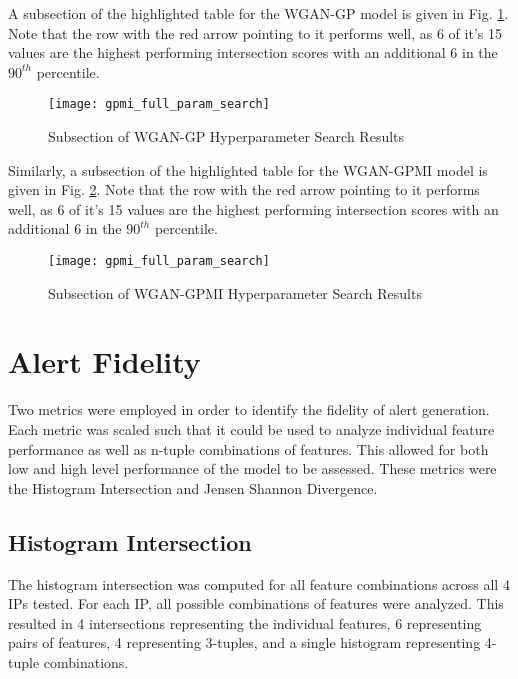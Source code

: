 A subsection of the highlighted table for the WGAN-GP model is given in Fig. \ref{fig:highlighted_param_wgan}. Note that the row with the red arrow pointing to it performs well, as 6 of it's 15 values are the highest performing intersection scores with an additional 6 in the $90^{th}$ percentile. 

\begin{figure}[!htbp]
	\centering
	\texttt{[image: gpmi\_full\_param\_search]}
	\caption{
		Subsection of WGAN-GP Hyperparameter Search Results 
	}
	\label{fig:highlighted_param_wgan}
\end{figure}

Similarly, a subsection of the highlighted table for the WGAN-GPMI model is given in Fig. \ref{fig:highlighted_param_gpmi}. Note that the row with the red arrow pointing to it performs well, as 6 of it's 15 values are the highest performing intersection scores with an additional 6 in the $90^{th}$ percentile. 

\begin{figure}[!htbp]
	\centering
	\texttt{[image: gpmi\_full\_param\_search]}
	\caption{
		Subsection of WGAN-GPMI Hyperparameter Search Results
	}
	\label{fig:highlighted_param_gpmi}
\end{figure}


\section{Alert Fidelity}
\label{sec:fidel}

Two metrics were employed in order to identify the fidelity of alert generation. Each metric was scaled such that it could be used to analyze individual feature performance as well as n-tuple combinations of features. This allowed for both low and high level performance of the model to be assessed. These metrics were the Histogram Intersection and Jensen Shannon Divergence. 

\subsection{Histogram Intersection}
\label{sec:inter}

The histogram intersection was computed for all feature combinations across all 4 IPs tested. For each IP, all possible combinations of features were analyzed. This resulted in 4 intersections representing the individual features, 6 representing pairs of features, 4 representing 3-tuples, and a single histogram representing 4-tuple combinations. 

